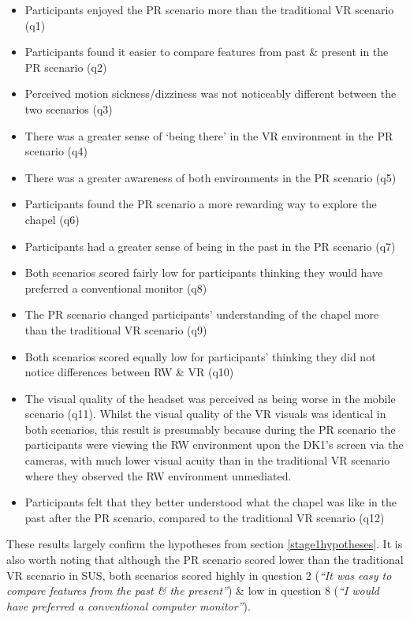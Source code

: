 \begin{itemize}
	\item Participants enjoyed the PR scenario more than the traditional VR scenario (q1)
	\item Participants found it easier to compare features from past \& present in the PR scenario (q2)
	\item Perceived motion sickness/dizziness was not noticeably different between the two scenarios (q3)
	\item There was a greater sense of `being there' in the VR environment in the PR scenario (q4)
	\item There was a greater awareness of both environments in the PR scenario (q5)
	\item Participants found the PR scenario a more rewarding way to explore the chapel (q6)
	\item Participants had a greater sense of being in the past in the PR scenario (q7)
	\item Both scenarios scored fairly low for participants thinking they would have preferred a conventional monitor (q8)
	\item The PR scenario changed participants’ understanding of the chapel more than the traditional VR scenario (q9)
	\item Both scenarios scored equally low for participants’ thinking they did not notice differences between RW \& VR (q10)
	\item The visual quality of the headset was perceived as being worse in the mobile scenario (q11). Whilst the visual quality of the VR visuals was identical in both scenarios, this result is presumably because during the PR scenario the participants were viewing the RW environment upon the DK1's screen via the cameras, with much lower visual acuity than in the traditional VR scenario where they observed the RW environment unmediated.
	\item Participants felt that they better understood what the chapel was like in the past after the PR scenario, compared to the traditional VR scenario (q12)
\end{itemize}

These results largely confirm the hypotheses from section \ref{stage1hypotheses}. It is also worth noting that although the PR scenario scored lower than the traditional VR scenario in SUS, both scenarios scored highly in question 2 (\textit{``It was easy to compare features from the past \& the present''}) \& low in question 8 (\textit{``I would have preferred a conventional computer monitor''}).

